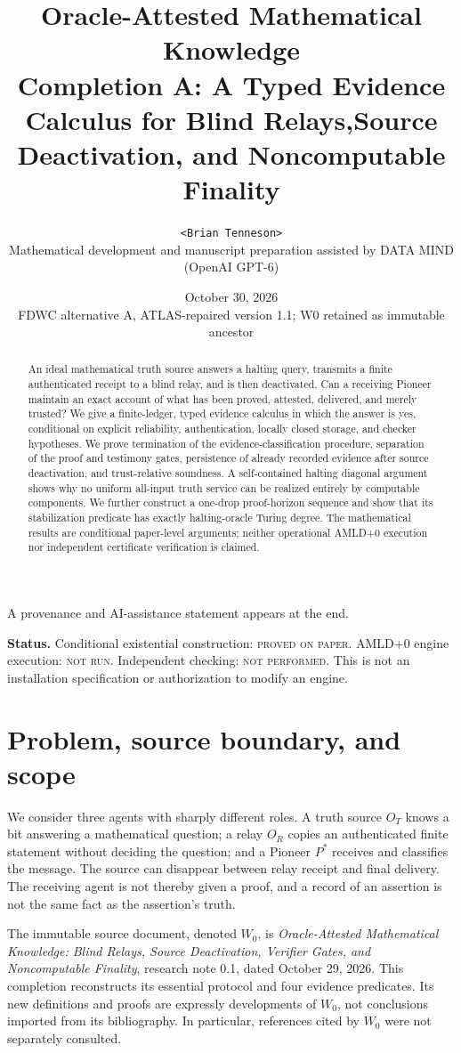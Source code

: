 \documentclass[11pt,letterpaper]{article}
\title{\bfseries Oracle-Attested Mathematical Knowledge\\[3pt]
\large Completion A: A Typed Evidence Calculus for Blind Relays,\newline Source Deactivation, and Noncomputable Finality}
\author{\texttt{<Brian Tenneson>}\\\small Mathematical development and manuscript preparation assisted by DATA MIND (OpenAI GPT-6)}
\date{October 30, 2026\\\small FDWC alternative A, ATLAS-repaired version 1.1; W0 retained as immutable ancestor}
\begin{document}
\maketitle
\begin{center}\small A provenance and AI-assistance statement appears at the end.\end{center}
\begin{abstract}
An ideal mathematical truth source answers a halting query, transmits a finite authenticated receipt to a blind relay, and is then deactivated. Can a receiving Pioneer maintain an exact account of what has been proved, attested, delivered, and merely trusted? We give a finite-ledger, typed evidence calculus in which the answer is yes, conditional on explicit reliability, authentication, locally closed storage, and checker hypotheses. We prove termination of the evidence-classification procedure, separation of the proof and testimony gates, persistence of already recorded evidence after source deactivation, and trust-relative soundness. A self-contained halting diagonal argument shows why no uniform all-input truth service can be realized entirely by computable components. We further construct a one-drop proof-horizon sequence and show that its stabilization predicate has exactly halting-oracle Turing degree. The mathematical results are conditional paper-level arguments; neither operational AMLD+0 execution nor independent certificate verification is claimed.
\end{abstract}
\noindent\textbf{Status.} Conditional existential construction: \textsc{proved on paper}. AMLD+0 engine execution: \textsc{not run}. Independent checking: \textsc{not performed}. This is not an installation specification or authorization to modify an engine.
\tableofcontents
\section{Problem, source boundary, and scope}
We consider three agents with sharply different roles. A truth source $O_T$ knows a bit answering a mathematical question; a relay $O_R$ copies an authenticated finite statement without deciding the question; and a Pioneer $P^*$ receives and classifies the message. The source can disappear between relay receipt and final delivery. The receiving agent is not thereby given a proof, and a record of an assertion is not the same fact as the assertion's truth.

The immutable source document, denoted $W_0$, is \emph{Oracle-Attested Mathematical Knowledge: Blind Relays, Source Deactivation, Verifier Gates, and Noncomputable Finality}, research note 0.1, dated October 29, 2026. This completion reconstructs its essential protocol and four evidence predicates. Its new definitions and proofs are expressly developments of $W_0$, not conclusions imported from its bibliography. In particular, references cited by $W_0$ were not separately consulted.
\end{document}

